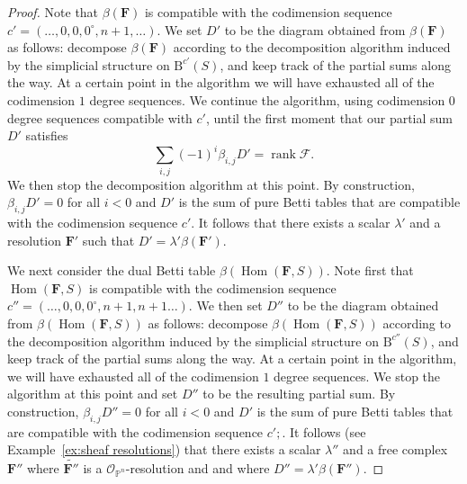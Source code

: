 \documentclass[12pt]{amsart}
\theoremstyle{definition}
\theoremstyle{remark}
\newcommand{\Hom}{\operatorname{Hom}} %
\newcommand{\rank}{\operatorname{rank}}
\newcommand{\PP}{\mathbb{P}}
\newcommand{\cc}{c}
\newcommand{\cO}{\mathcal{O}}
\newcommand{\cF}{\mathcal{F}}
\newcommand{\FF}{\mathbf{F}}
\newcommand{\zp}{\circ}
\newcommand{\BBQ}{\mathrm{B}}
\begin{document}
\begin{proof}
Note that $\beta(\FF)$ is compatible with the codimension sequence $\cc'=(\dots,0,0,0^{\zp},n+1,\dots)$. We set $D'$ to be the diagram obtained from $\beta(\FF)$ as follows: decompose $\beta(\FF)$ according to the decomposition algorithm induced by the simplicial structure on $\BBQ^{\cc'}(S)$, and keep track of the partial sums along the way.  At a certain point in the algorithm we will have exhausted all of the codimension $1$ degree sequences.  We continue the algorithm, using codimension $0$ degree sequences compatible with $\cc'$, until the first moment that our partial sum $D'$ satisfies
\[
\sum_{i,j} (-1)^i\beta_{i,j}D'=\rank \cF.
\]
We then stop the decomposition algorithm at this point.  By construction, $\beta_{i,j}D'=0$ for all $i<0$ and $D'$ is the sum of pure Betti tables that are compatible with the codimension sequence $\cc'$.  It follows that there exists a scalar $\lambda'$ and a resolution $\FF'$ such that $D'=\lambda'\beta(\FF')$.

We next consider the dual Betti table $\beta(\Hom(\FF,S))$.  Note first that $\Hom(\FF,S)$ is compatible with the codimension sequence $\cc''=(\dots,0,0,0^{\zp},n+1,n+1\dots)$.  We then set $D''$ to be the diagram obtained from $\beta(\Hom(\FF,S))$ as follows: decompose $\beta(\Hom(\FF,S))$ according to the decomposition algorithm induced by the simplicial structure on $\BBQ^{\cc''}(S)$, and keep track of the partial sums along the way.  At a certain point in the algorithm, we will have exhausted all of the codimension $1$ degree sequences.  We stop the algorithm at this point and set $D''$ to be the resulting partial sum.
By construction, $\beta_{i,j}D''=0$ for all $i<0$ and $D'$ is the sum of pure Betti tables that are compatible with the codimension sequence $\cc';$.
It follows (see Example~\ref{ex:sheaf resolutions}) that there exists a scalar $\lambda''$ and a free complex $\FF''$ where $\widetilde{\FF''}$ is a $\cO_{\PP^n}$-resolution and and where $D''=\lambda'\beta(\FF'')$.


\end{proof}
\end{document}
